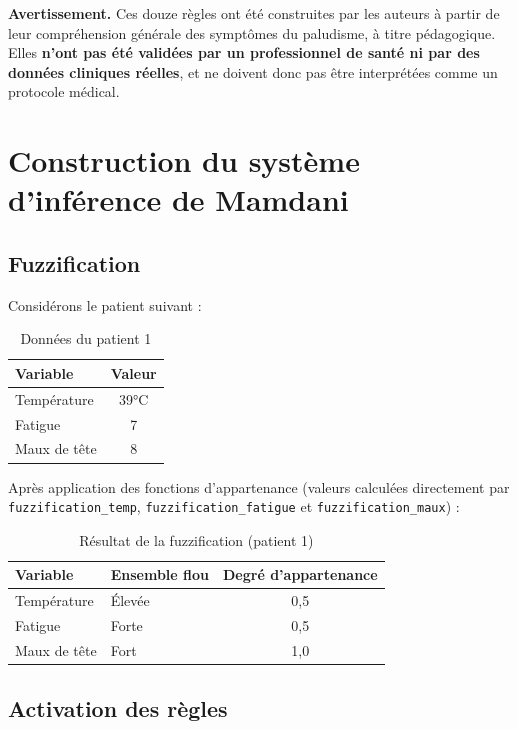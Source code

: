 \documentclass[a4paper,12pt]{report} %
\begin{document}
\textbf{Avertissement.} Ces douze règles ont été construites par les auteurs à partir de leur compréhension générale des symptômes du paludisme, à titre pédagogique. Elles \textbf{n'ont pas été validées par un professionnel de santé ni par des données cliniques réelles}, et ne doivent donc pas être interprétées comme un protocole médical.


\section{Construction du système d'inférence de Mamdani}

\subsection{Fuzzification}

Considérons le patient suivant :

\begin{table}[H]
\centering
\caption{Données du patient 1}
\begin{tabular}{|l|c|}
\hline
\textbf{Variable} & \textbf{Valeur} \\
\hline
Température & 39°C \\
Fatigue & 7 \\
Maux de tête & 8 \\
\hline
\end{tabular}
\end{table}

Après application des fonctions d'appartenance (valeurs calculées directement par \texttt{fuzzification\_temp}, \texttt{fuzzification\_fatigue} et \texttt{fuzzification\_maux}) :

\begin{table}[H]
\centering
\caption{Résultat de la fuzzification (patient 1)}
\begin{tabular}{|l|l|c|}
\hline
\textbf{Variable} & \textbf{Ensemble flou} & \textbf{Degré d'appartenance} \\
\hline
Température & Élevée & 0,5 \\
Fatigue & Forte & 0,5 \\
Maux de tête & Fort & 1,0 \\
\hline
\end{tabular}
\end{table}

\subsection{Activation des règles}
\end{document}
